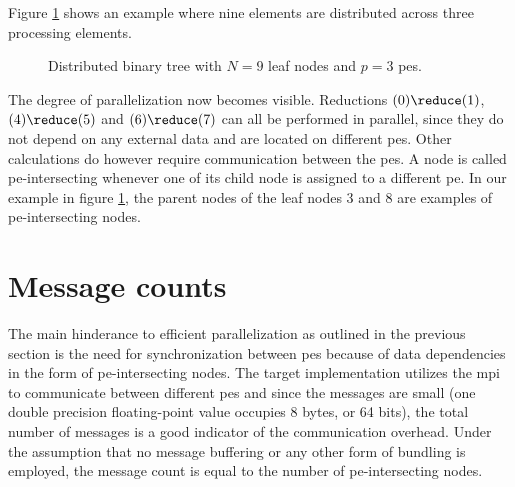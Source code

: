 Figure \ref{fig:distributed_binary_tree} shows an example where nine elements are distributed across three processing elements.
\begin{figure}[H]
\centering
{}
\caption{Distributed binary tree with $N=9$ leaf nodes and $p=3$ \glspl{pe}.}
\label{fig:distributed_binary_tree}
\end{figure}
The degree of parallelization now becomes visible. Reductions $(0) \reduce (1)$, $(4) \reduce (5)$ and $(6) \reduce (7)$ can all be performed in parallel, since
they do not depend on any external data and are located on different \glspl{pe}.
Other calculations do however require communication between the \glspl{pe}.
A node is called \gls{pe}-intersecting whenever one of its child node is assigned to a different \gls{pe}.
In our example in figure \ref{fig:distributed_binary_tree}, the parent nodes of the leaf nodes $3$ and $8$ are examples of \gls{pe}-intersecting nodes.

\section{Message counts}
The main hinderance to efficient parallelization as outlined in the previous section is the need for synchronization between \glspl{pe} because of data dependencies in the form of \gls{pe}-intersecting nodes.
The target implementation utilizes the \gls{mpi} to communicate between different \glspl{pe} and since the messages are small (one double precision floating-point value occupies 8 bytes, or 64 bits), the total number of messages is a good indicator of the communication overhead.
Under the assumption that no message buffering or any other form of bundling is employed, the message count is equal to the number of \gls{pe}-intersecting nodes.

